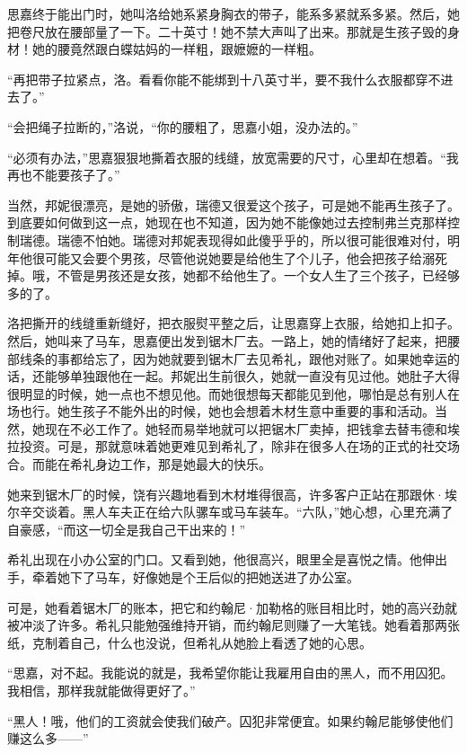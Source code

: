 \par 思嘉终于能出门时，她叫洛给她系紧身胸衣的带子，能系多紧就系多紧。然后，她把卷尺放在腰部量了一下。二十英寸！她不禁大声叫了出来。那就是生孩子毁的身材！她的腰竟然跟白蝶姑妈的一样粗，跟嬷嬷的一样粗。
\par “再把带子拉紧点，洛。看看你能不能绑到十八英寸半，要不我什么衣服都穿不进去了。”
\par “会把绳子拉断的，”洛说，“你的腰粗了，思嘉小姐，没办法的。”
\par “必须有办法，”思嘉狠狠地撕着衣服的线缝，放宽需要的尺寸，心里却在想着。“我再也不能要孩子了。”
\par 当然，邦妮很漂亮，是她的骄傲，瑞德又很爱这个孩子，可是她不能再生孩子了。到底要如何做到这一点，她现在也不知道，因为她不能像她过去控制弗兰克那样控制瑞德。瑞德不怕她。瑞德对邦妮表现得如此傻乎乎的，所以很可能很难对付，明年他很可能又会要个男孩，尽管他说她要是给他生了个儿子，他会把孩子给溺死掉。哦，不管是男孩还是女孩，她都不给他生了。一个女人生了三个孩子，已经够多的了。
\par 洛把撕开的线缝重新缝好，把衣服熨平整之后，让思嘉穿上衣服，给她扣上扣子。然后，她叫来了马车，思嘉便出发到锯木厂去。一路上，她的情绪好了起来，把腰部线条的事都给忘了，因为她就要到锯木厂去见希礼，跟他对账了。如果她幸运的话，还能够单独跟他在一起。邦妮出生前很久，她就一直没有见过他。她肚子大得很明显的时候，她一点也不想见他。而她很想每天都能见到他，哪怕是总有别人在场也行。她生孩子不能外出的时候，她也会想着木材生意中重要的事和活动。当然，她现在不必工作了。她轻而易举地就可以把锯木厂卖掉，把钱拿去替韦德和埃拉投资。可是，那就意味着她更难见到希礼了，除非在很多人在场的正式的社交场合。而能在希礼身边工作，那是她最大的快乐。
\par 她来到锯木厂的时候，饶有兴趣地看到木材堆得很高，许多客户正站在那跟休·埃尔辛交谈着。黑人车夫正在给六队骡车或马车装车。“六队，”她心想，心里充满了自豪感，“而这一切全是我自己干出来的！”
\par 希礼出现在小办公室的门口。又看到她，他很高兴，眼里全是喜悦之情。他伸出手，牵着她下了马车，好像她是个王后似的把她送进了办公室。
\par 可是，她看着锯木厂的账本，把它和约翰尼·加勒格的账目相比时，她的高兴劲就被冲淡了许多。希礼只能勉强维持开销，而约翰尼则赚了一大笔钱。她看着那两张纸，克制着自己，什么也没说，但希礼从她脸上看透了她的心思。
\par “思嘉，对不起。我能说的就是，我希望你能让我雇用自由的黑人，而不用囚犯。我相信，那样我就能做得更好了。”
\par “黑人！哦，他们的工资就会使我们破产。囚犯非常便宜。如果约翰尼能够使他们赚这么多——”
